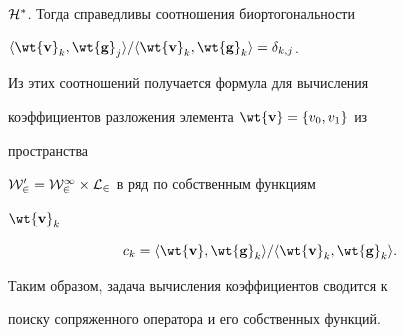 $\cal H^*$. Тогда справедливы соотношения биортогональности 


$\la\wt{\bold v}_k,\wt{\bold g}_j\ra/\la\wt{\bold v}_k, 


\wt{\bold g}_k\ra=\delta_{k,j}$. 


Из этих соотношений получается формула для вычисления  


коэффициентов разложения элемента $\wt{\bold v}=\{v_0,v_1\}$ из 


пространства 


$\cal W^0_2=W^1_2\times L_2$ в ряд по собственным функциям 


$\wt{\bold v}_k$ 


\begin{equation} 


c_k=\la\wt{\bold v},\wt{\bold g}_k\ra/ 


\la\wt{\bold v}_k,\wt{\bold g}_k\ra. 


\end{equation} 


 


Таким образом, задача вычисления коэффициентов сводится к  


поиску сопряженного оператора и его собственных функций. 


 


